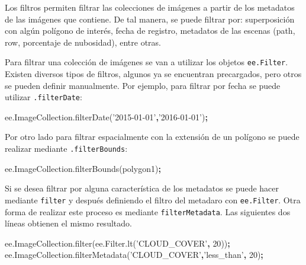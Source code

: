 \documentclass[
]{article}
\newenvironment{Shaded}{\begin{snugshade}}{\end{snugshade}}
\newcommand{\AttributeTok}[1]{\textcolor[rgb]{0.77,0.63,0.00}{#1}}
\newcommand{\DecValTok}[1]{\textcolor[rgb]{0.00,0.00,0.81}{#1}}
\newcommand{\NormalTok}[1]{#1}
\newcommand{\OperatorTok}[1]{\textcolor[rgb]{0.81,0.36,0.00}{\textbf{#1}}}
\newcommand{\StringTok}[1]{\textcolor[rgb]{0.31,0.60,0.02}{#1}}
\newcommand{\VariableTok}[1]{\textcolor[rgb]{0.00,0.00,0.00}{#1}}
\begin{document}
Los filtros permiten filtrar las colecciones de imágenes a partir de los
metadatos de las imágenes que contiene. De tal manera, se puede filtrar
por: superposición con algún polígono de interés, fecha de registro,
metadatos de las escenas (path, row, porcentaje de nubosidad), entre
otras.

Para filtrar una colección de imágenes se van a utilizar los objetos
\texttt{ee.Filter}. Existen diversos tipos de filtros, algunos ya se
encuentran precargados, pero otros se pueden definir manualmente. Por
ejemplo, para filtrar por fecha se puede utilizar \texttt{.filterDate}:

\begin{Shaded}
\begin{Highlighting}[]
\VariableTok{ee}\NormalTok{.}\VariableTok{ImageCollection}\NormalTok{.}\AttributeTok{filterDate}\NormalTok{(}\StringTok{'2015-01-01'}\OperatorTok{,}\StringTok{'2016-01-01'}\NormalTok{)}\OperatorTok{;}
\end{Highlighting}
\end{Shaded}

Por otro lado para filtrar espacialmente con la extensión de un polígono
se puede realizar mediante \texttt{.filterBounds}:

\begin{Shaded}
\begin{Highlighting}[]
\VariableTok{ee}\NormalTok{.}\VariableTok{ImageCollection}\NormalTok{.}\AttributeTok{filterBounds}\NormalTok{(polygon1)}\OperatorTok{;} 
\end{Highlighting}
\end{Shaded}

Si se desea filtrar por alguna característica de los metadatos se puede
hacer mediante \texttt{filter} y después definiendo el filtro del
metadaro con \texttt{ee.Filter}. Otra forma de realizar este proceso es
mediante \texttt{filterMetadata}. Las siguientes dos líneas obtienen el
mismo resultado.

\begin{Shaded}
\begin{Highlighting}[]
\VariableTok{ee}\NormalTok{.}\VariableTok{ImageCollection}\NormalTok{.}\AttributeTok{filter}\NormalTok{(}\VariableTok{ee}\NormalTok{.}\VariableTok{Filter}\NormalTok{.}\AttributeTok{lt}\NormalTok{(}\StringTok{'CLOUD_COVER'}\OperatorTok{,} \DecValTok{20}\NormalTok{))}\OperatorTok{;}
\VariableTok{ee}\NormalTok{.}\VariableTok{ImageCollection}\NormalTok{.}\AttributeTok{filterMetadata}\NormalTok{(}\StringTok{'CLOUD_COVER'}\OperatorTok{,}\StringTok{'less_than'}\OperatorTok{,} \DecValTok{20}\NormalTok{)}\OperatorTok{;}
\end{Highlighting}
\end{Shaded}
\end{document}
